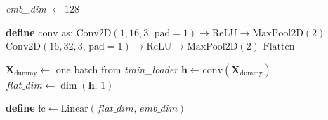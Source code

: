 \documentclass{article}
\begin{document}
\begin{algorithm}[H]
\caption{SVDDNet\,—\,Convolutional Encoder for Deep-SVDD}

\DontPrintSemicolon

\textit{emb\_dim} $\leftarrow 128$\;

\vspace{0.3em}
\textbf{define} $\mathrm{conv}$ as:\;
\Indp
$\mathrm{Conv2D}(1,16,3,\,\text{pad}=1)\!\rightarrow\!\mathrm{ReLU}\!\rightarrow\!\mathrm{MaxPool2D}(2)$\;
$\mathrm{Conv2D}(16,32,3,\,\text{pad}=1)\!\rightarrow\!\mathrm{ReLU}\!\rightarrow\!\mathrm{MaxPool2D}(2)$\;
$\mathrm{Flatten}$\;
\Indm

\BlankLine
$\mathbf X_{\text{dummy}} \leftarrow$ one batch from \textit{train\_loader}\;
$\mathbf h \leftarrow \mathrm{conv}(\mathbf X_{\text{dummy}})$\;
$\textit{flat\_dim} \leftarrow \operatorname{dim}(\mathbf h,\,1)$\;

\BlankLine
\textbf{define} $\mathrm{fc} \leftarrow \mathrm{Linear}(\textit{flat\_dim},\,\textit{emb\_dim})$\;

\BlankLine

\end{algorithm}
\end{document}
